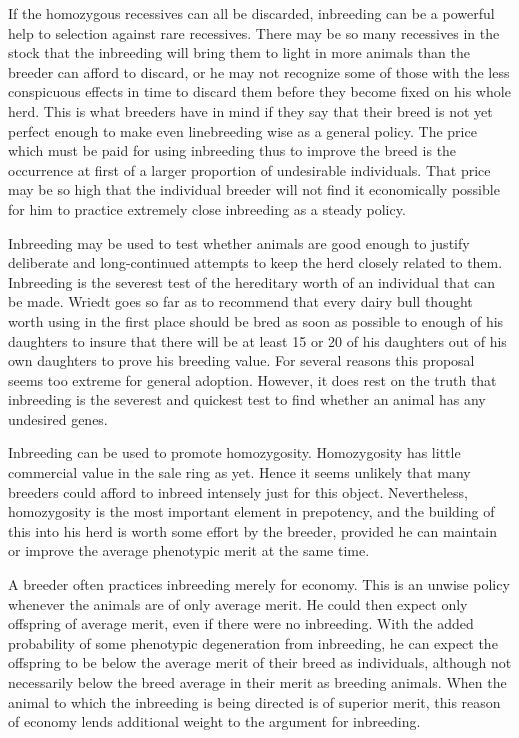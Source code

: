 If the homozygous recessives can all be discarded, inbreeding can be
a powerful help to selection against rare recessives. There may be so
many recessives in the stock that the inbreeding will bring them to light
in more animals than the breeder can afford to discard, or he may not
recognize some of those with the less conspicuous effects in time to discard
them before they become fixed on his whole herd. This is what
breeders have in mind if they say that their breed is not yet perfect
enough to make even linebreeding wise as a general policy. The price
which must be paid for using inbreeding thus to improve the breed is
the occurrence at first of a larger proportion of undesirable individuals.
That price may be so high that the individual breeder will not find it
economically possible for him to practice extremely close inbreeding as
a steady policy.

Inbreeding may be used to test whether animals are good enough to
justify deliberate and long-continued attempts to keep the herd closely
related to them. Inbreeding is the severest test of the hereditary worth
of an individual that can be made. Wriedt goes so far as to recommend
that every dairy bull thought worth using in the first place should be
bred as soon as possible to enough of his daughters to insure that there
will be at least 15 or 20 of his daughters out of his own daughters to
prove his breeding value. For several reasons this proposal seems too
extreme for general adoption. However, it does rest on the truth that
inbreeding is the severest and quickest test to find whether an animal
has any undesired genes.

Inbreeding can be used to promote homozygosity. Homozygosity has
little commercial value in the sale ring as yet. Hence it seems unlikely
that many breeders could afford to inbreed intensely just for this object.
Nevertheless, homozygosity is the most important element in prepotency,
and the building of this into his herd is worth some effort by the
breeder, provided he can maintain or improve the average phenotypic
merit at the same time.

A breeder often practices inbreeding merely for economy. This is
an unwise policy whenever the animals are of only average merit. He
could then expect only offspring of average merit, even if there were no
inbreeding. With the added probability of some phenotypic degeneration
from inbreeding, he can expect the offspring to be below the average
merit of their breed as individuals, although not necessarily below
the breed average in their merit as breeding animals. When the animal
to which the inbreeding is being directed is of superior merit, this reason
of economy lends additional weight to the argument for inbreeding.

